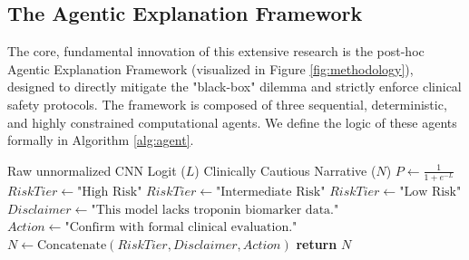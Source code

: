 \documentclass[10pt,twocolumn,letterpaper]{article}
\begin{document}
\subsection{The Agentic Explanation Framework}

The core, fundamental innovation of this extensive research is the post-hoc Agentic Explanation Framework (visualized in Figure \ref{fig:methodology}), designed to directly mitigate the "black-box" dilemma and strictly enforce clinical safety protocols. The framework is composed of three sequential, deterministic, and highly constrained computational agents. We define the logic of these agents formally in Algorithm \ref{alg:agent}.

\begin{algorithm}
\caption{Deterministic Agentic Explanation Workflow}\label{alg:agent}
\begin{algorithmic}[1]
\Require Raw unnormalized CNN Logit ($L$)
\Ensure Clinically Cautious Narrative ($N$)
\State $P \gets \frac{1}{1 + e^{-L}}$ 
    \State $RiskTier \gets \text{"High Risk"}$
    \State $RiskTier \gets \text{"Intermediate Risk"}$
\Else
    \State $RiskTier \gets \text{"Low Risk"}$
\EndIf
\State $Disclaimer \gets \text{"This model lacks troponin biomarker data."}$
\State $Action \gets \text{"Confirm with formal clinical evaluation."}$
\State $N \gets \text{Concatenate}(RiskTier, Disclaimer, Action)$
\State \textbf{return} $N$
\end{algorithmic}
\end{algorithm}
\end{document}
